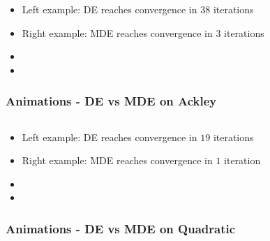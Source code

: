 \documentclass{beamer}
\begin{document}
\begin{frame}
\begin{itemize}
  \item Left example: DE reaches convergence in $38$ iterations
  \item Right example: MDE reaches convergence in $3$ iterations
\end{itemize}

\begin{itemize}
  \item[]
  \item[]
\end{itemize}

\frametitle{Animations - DE vs MDE on Ackley}
  \begin{columns}[t]
    \centering
    \centering
  \end{columns}
\end{frame}
\begin{frame}
\begin{itemize}
  \item Left example: DE reaches convergence in $19$ iterations
  \item Right example: MDE reaches convergence in $1$ iteration
\end{itemize}

\begin{itemize}
  \item[]
  \item[]
\end{itemize}

\frametitle{Animations - DE vs MDE on Quadratic}
  \begin{columns}[t]
    \centering
    \centering
  \end{columns}
\end{frame}
\end{document}
